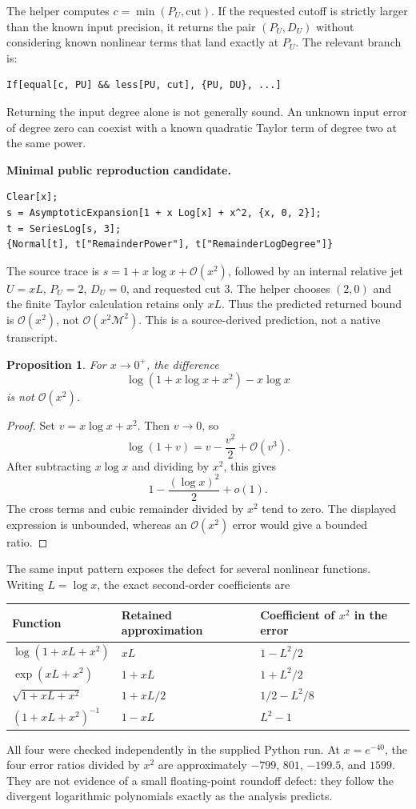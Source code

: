 \documentclass[11pt,letterpaper]{article}
\newcommand{\OO}{\mathcal O}
\newcommand{\M}{\mathcal M}
\newtheorem{proposition}{Proposition}[section]
\begin{document}
The helper computes $c=\min(P_U,\mathrm{cut})$. If the requested cutoff is strictly larger than the known input precision, it returns the pair $(P_U,D_U)$ without considering known nonlinear terms that land exactly at $P_U$. The relevant branch is:
\begin{lstlisting}
If[equal[c, PU] && less[PU, cut], {PU, DU}, ...]
\end{lstlisting}
Returning the input degree alone is not generally sound. An unknown input error of degree zero can coexist with a known quadratic Taylor term of degree two at the same power.

\begin{minipage}{\linewidth}
\textbf{Minimal public reproduction candidate.}
\begin{lstlisting}
Clear[x];
s = AsymptoticExpansion[1 + x Log[x] + x^2, {x, 0, 2}];
t = SeriesLog[s, 3];
{Normal[t], t["RemainderPower"], t["RemainderLogDegree"]}
\end{lstlisting}
\end{minipage}

The source trace is $s=1+x\log x+\OO(x^2)$, followed by an internal relative jet $U=xL$, $P_U=2$, $D_U=0$, and requested cut $3$. The helper chooses $(2,0)$ and the finite Taylor calculation retains only $xL$. Thus the predicted returned bound is $\OO(x^2)$, not $\OO(x^2\M^2)$. This is a source-derived prediction, not a native transcript.

\begin{proposition}
For $x\to0^+$, the difference
\[
 \log(1+x\log x+x^2)-x\log x
\]
is not $\OO(x^2)$.
\end{proposition}
\begin{proof}
Set $v=x\log x+x^2$. Then $v\to0$, so
\[
 \log(1+v)=v-\frac{v^2}{2}+\OO(v^3).
\]
After subtracting $x\log x$ and dividing by $x^2$, this gives
\[
 1-\frac{(\log x)^2}{2}+o(1).
\]
The cross terms and cubic remainder divided by $x^2$ tend to zero. The displayed expression is unbounded, whereas an $\OO(x^2)$ error would give a bounded ratio.
\end{proof}

The same input pattern exposes the defect for several nonlinear functions. Writing $L=\log x$, the exact second-order coefficients are
\begin{center}
\begin{tabular}{@{}lll@{}}\toprule
Function & Retained approximation & Coefficient of $x^2$ in the error\\\midrule
$\log(1+xL+x^2)$ & $xL$ & $1-L^2/2$\\
$\exp(xL+x^2)$ & $1+xL$ & $1+L^2/2$\\
$\sqrt{1+xL+x^2}$ & $1+xL/2$ & $1/2-L^2/8$\\
$(1+xL+x^2)^{-1}$ & $1-xL$ & $L^2-1$\\\bottomrule
\end{tabular}
\end{center}
All four were checked independently in the supplied Python run. At $x=e^{-40}$, the four error ratios divided by $x^2$ are approximately $-799$, $801$, $-199.5$, and $1599$. They are not evidence of a small floating-point roundoff defect: they follow the divergent logarithmic polynomials exactly as the analysis predicts.
\end{document}
